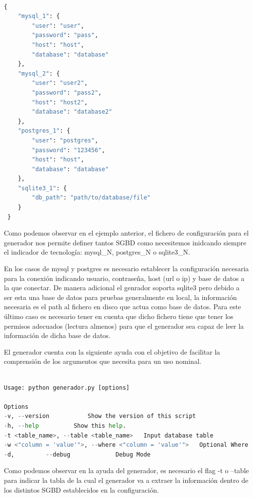 \documentclass[a4paper,11pt]{book}
\begin{document}
\begin{lstlisting}[language=python,caption={ Entrada Completa Configuración Generador }]

{
 	"mysql_1": {
 		"user": "user",
 		"password": "pass",
 		"host": "host",
 		"database": "database"
 	},
 	"mysql_2": {
 		"user": "user2",
 		"password": "pass2",
 		"host": "host2",
 		"database": "database2"
 	},
 	"postgres_1": {
 		"user": "postgres",
 		"password": "123456",
 		"host": "host",
 		"database": "database"
 	},
 	"sqlite3_1": {
 		"db_path": "path/to/database/file"
 	}
 }
\end{lstlisting}

Como podemos observar en el ejemplo anterior, el fichero de configuración para el generador nos permite definer tantos SGBD como necesitemos inidcando siempre el indicador de tecnología: mysql\_N, postgres\_N o sqlite3\_N.

En los casos de mysql y postgres es necesario establecer la configuración necesaria para la conexión indicando usuario, contraseña, host (url o ip) y base de datos a la que conectar. De manera adicional el genrador soporta sqlite3 pero debido a ser esta una base de datos para pruebas generalmente en local, la información necesaria es el path al fichero en disco que actua como base de datos. Para este último caso es necesario tener en cuenta que dicho fichero tiene que tener los permisos adecuados (lectura almenos) para que el generador sea capaz de leer la información de dicha base de datos. 


El generador cuenta con la siguiente ayuda con el objetivo de facilitar la comprensión de los argumentos que necesita para un uso nominal. 


\begin{lstlisting}[language=python,caption={ python generadorP2.py --help }]

Usage: python generador.py [options]

Options
-v, --version			Show the version of this script
-h, --help			Show this help.
-t <table_name>, --table <table_name>   Input database table
-w <"column = 'value'">, --where <"column = 'value'">   Optional Where Clause
-d,         --debug         	Debug Mode

\end{lstlisting}

Como podemos observar en la ayuda del generador, es necesario el flag -t o --table para indicar la tabla de la cual el generador va a extraer la información  dentro de los distintos SGBD establecidos en la configuración. 
\end{document}
